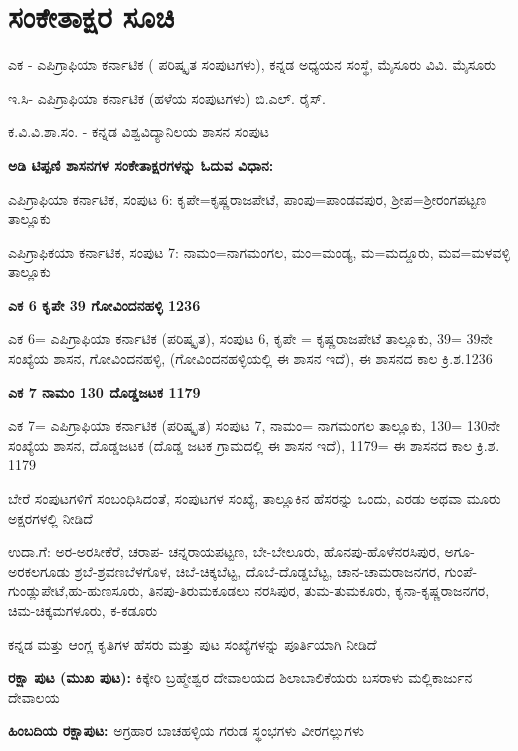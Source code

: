 
\chapter*{ಸಂಕೇತಾಕ್ಷರ ಸೂಚಿ}

\noindent
ಎಕ - ಎಪಿಗ್ರಾಫಿಯಾ ಕರ್ನಾಟಿಕ ( ಪರಿಷ್ಕೃತ ಸಂಪುಟಗಳು), ಕನ್ನಡ ಅಧ್ಯಯನ ಸಂಸ್ಥೆ, ಮೈಸೂರು ವಿವಿ. ಮೈಸೂರು

\noindent
ಇ.ಸಿ- ಎಪಿಗ್ರಾಫಿಯಾ ಕರ್ನಾಟಿಕ (ಹಳೆಯ ಸಂಪುಟಗಳು) ಬಿ.ಎಲ್​. ರೈಸ್​.

\noindent
ಕ.ವಿ.ವಿ.ಶಾ.ಸಂ. - ಕನ್ನಡ ವಿಶ್ವವಿದ್ಯಾನಿಲಯ ಶಾಸನ ಸಂಪುಟ

\noindent
\textbf{ಅಡಿ ಟಿಪ್ಪಣಿ ಶಾಸನಗಳ ಸಂಕೇತಾಕ್ಷರಗಳನ್ನು ಓದುವ ವಿಧಾನ:}

\noindent
ಎಪಿಗ್ರಾಫಿಯಾ ಕರ್ನಾಟಿಕ, ಸಂಪುಟ 6: ಕೃಪೇ=ಕೃಷ್ಣರಾಜಪೇಟೆ, ಪಾಂಪು=ಪಾಂಡವಪುರ, ಶ‍್ರೀಪ=ಶ‍್ರೀರಂಗಪಟ್ಟಣ ತಾಲ್ಲೂಕು

\noindent
ಎಪಿಗ್ರಾಫಿಕಯಾ ಕರ್ನಾಟಿಕ, ಸಂಪುಟ 7: ನಾಮಂ=ನಾಗಮಂಗಲ, ಮಂ=ಮಂಡ್ಯ, ಮ=ಮದ್ದೂರು, ಮವ=ಮಳವಳ್ಳಿ ತಾಲ್ಲೂಕು

\noindent
\textbf{ಎಕ 6 ಕೃಪೇ 39 ಗೋವಿಂದನಹಳ್ಳಿ 1236}

\noindent
ಎಕ 6= ಎಪಿಗ್ರಾಫಿಯಾ ಕರ್ನಾಟಿಕ (ಪರಿಷ್ಕೃತ), ಸಂಪುಟ 6, ಕೃಪೇ = ಕೃಷ್ಣರಾಜಪೇಟೆ ತಾಲ್ಲೂಕು, 39= 39ನೇ ಸಂಖ್ಯೆಯ ಶಾಸನ, ಗೋವಿಂದನಹಳ್ಳಿ, (ಗೋವಿಂದನಹಳ್ಳಿಯಲ್ಲಿ ಈ ಶಾಸನ ಇದೆ), ಈ ಶಾಸನದ ಕಾಲ ಕ್ರಿ.ಶ.1236

\noindent
\textbf{ಎಕ 7 ನಾಮಂ 130 ದೊಡ್ಡಜಟಕ 1179}

\noindent
ಎಕ 7= ಎಪಿಗ್ರಾಫಿಯಾ ಕರ್ನಾಟಿಕ (ಪರಿಷ್ಕೃತ) ಸಂಪುಟ 7, ನಾಮಂ= ನಾಗಮಂಗಲ ತಾಲ್ಲೂಕು, 130= 130ನೇ ಸಂಖ್ಯೆಯ ಶಾಸನ, ದೊಡ್ಡಜಟಕ (ದೊಡ್ಡ ಜಟಕ ಗ್ರಾಮದಲ್ಲಿ ಈ ಶಾಸನ ಇದೆ), 1179= ಈ ಶಾಸನದ ಕಾಲ ಕ್ರಿ.ಶ. 1179

\noindent
ಬೇರೆ ಸಂಪುಟಗಳಿಗೆ ಸಂಬಂಧಿಸಿದಂತೆ, ಸಂಪುಟಗಳ ಸಂಖ್ಯೆ, ತಾಲ್ಲೂಕಿನ ಹೆಸರನ್ನು ಒಂದು, ಎರಡು ಅಥವಾ ಮೂರು ಅಕ್ಷರ\-ಗಳಲ್ಲಿ ನೀಡಿದೆ

\noindent
ಉದಾ.ಗೆ: ಅರ-ಅರಸೀಕೆರೆ, ಚರಾಪ- ಚನ್ನರಾಯಪಟ್ಟಣ, ಬೇ-ಬೇಲೂರು, ಹೊನಪು-ಹೊಳೆನರಸಿಪುರ, ಅಗೂ-ಅರಕಲ\-ಗೂಡು ಶ್ರಬೆ-ಶ್ರವಣಬೆಳಗೊಳ, ಚಿಬೆ-ಚಿಕ್ಕಬೆಟ್ಟ, ದೊಬೆ-ದೊಡ್ಡಬೆಟ್ಟ, ಚಾನ-ಚಾಮರಾಜನಗರ, ಗುಂಪೆ-ಗುಂಡ್ಲುಪೇಟೆ,\break ಹು-ಹುಣಸೂರು, ತಿನಪು-ತಿರುಮಕೂಡಲು ನರಸಿಪುರ, ತುಮ-ತುಮಕೂರು, ಕೃನಾ-ಕೃಷ್ಣರಾಜನಗರ, ಚಿಮ-ಚಿಕ್ಕ\-ಮಗಳೂರು, ಕ-ಕಡೂರು

\noindent
ಕನ್ನಡ ಮತ್ತು ಆಂಗ್ಲ ಕೃತಿಗಳ ಹೆಸರು ಮತ್ತು ಪುಟ ಸಂಖ್ಯೆಗಳನ್ನು ಪೂರ್ತಿಯಾಗಿ ನೀಡಿದೆ

\delimiter

\textbf{ರಕ್ಷಾ ಪುಟ (ಮುಖ ಪುಟ):} ಕಿಕ್ಕೇರಿ ಬ್ರಹ್ಮೇಶ್ವರ ದೇವಾಲಯದ ಶಿಲಾಬಾಲಿಕೆಯರು ಬಸರಾಳು ಮಲ್ಲಿಕಾರ್ಜುನ ದೇವಾಲಯ

\textbf{ಹಿಂಬದಿಯ ರಕ್ಷಾಪುಟ:} ಅಗ್ರಹಾರ ಬಾಚಹಳ್ಳಿಯ ಗರುಡ ಸ್ಥಂಭಗಳು ವೀರಗಲ್ಲುಗಳು

